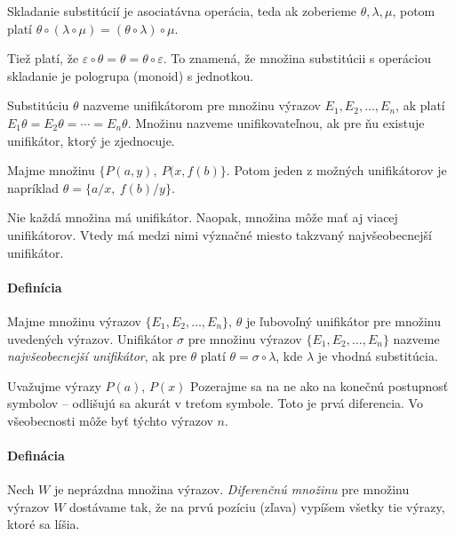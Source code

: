 \begin{poznamka}
    Skladanie substitúcií je asociatávna operácia, teda ak zoberieme 
    $\theta, \lambda, \mu$, potom platí 
    $\theta \circ(\lambda \circ \mu) = (\theta \circ \lambda) \circ \mu$.

    Tiež platí, že $\varepsilon \circ \theta = \theta = 
            \theta \circ \varepsilon$.
    To znamená, že množina substitúcii s operáciou skladanie je
    pologrupa (monoid) s jednotkou.
\end{poznamka}

\begin{definicia}[unifikátor]
    Substitúciu $\theta$ nazveme unifikátorom pre
    množinu výrazov $E_1, E_2, \dots, E_n$,
    ak platí $E_1\theta = E_2\theta = \cdots = E_n\theta$.
    Množinu nazveme unifikovateľnou, ak pre ňu existuje
    unifikátor, ktorý je zjednocuje.
\end{definicia}

\begin{priklad}
    Majme množinu $\{P(a,y),\ P(x,f(b)\}$.
    Potom jeden z možných unifikátorov je napríklad
    $\theta = \{a/x,\ f(b)/y\}$.
\end{priklad}

\begin{poznamka}
    Nie každá množina má unifikátor. Naopak, množina môže mať aj
    viacej unifikátorov. Vtedy má medzi nimi význačné miesto takzvaný
    najvšeobecnejší unifikátor.
\end{poznamka}

\startFIXME
\paragraph{Definícia} Majme množinu výrazov $\{ E_1, E_2, \ldots, E_n\}$,
$\theta$ je ľubovoľný unifikátor pre množinu uvedených výrazov. Unifikátor
$\sigma$ pre množinu výrazov $\{E_1, E_2, \ldots, E_n\}$ nazveme
\emph{najvšeobecnejší unifikátor}, ak pre $\theta$ platí $\theta = \sigma \circ
\lambda$, kde $\lambda$ je vhodná substitúcia.

\par Uvažujme výrazy $P(a)$, $P(x)$ Pozerajme sa na ne ako na konečnú
postupnosť symbolov -- odlišujú sa akurát v treťom symbole. Toto je prvá
diferencia. Vo všeobecnosti môže byť týchto výrazov $n$.

\paragraph{Definácia} Nech $W$ je neprázdna množina výrazov. \emph{Diferenčnú
množinu}
pre množinu výrazov $W$ dostávame tak, že na prvú pozíciu (zľava) vypíšem všetky
tie výrazy, ktoré sa líšia. 

